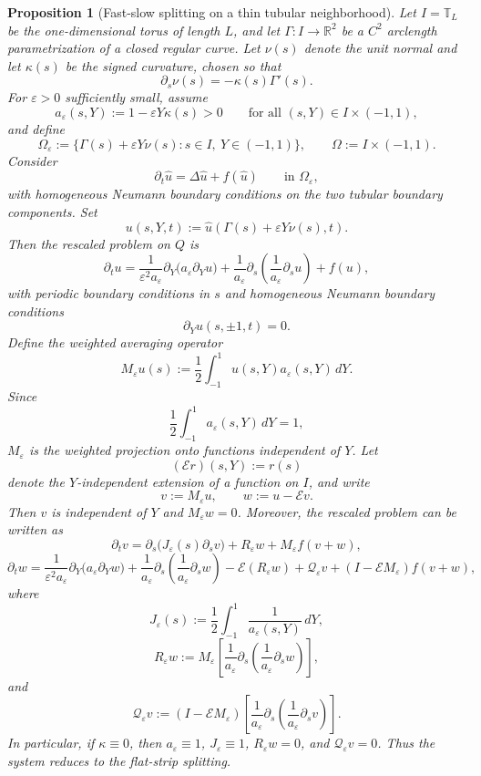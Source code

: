 \documentclass[11pt]{article}
\newtheorem{proposition}[theorem]{Proposition}
\theoremstyle{definition}
\theoremstyle{remark}
\numberwithin{equation}{section}
\begin{document}
\begin{proposition}[Fast-slow splitting on a thin tubular neighborhood]\label{prop:tubular}
Let \(I=\mathbb T_L\) be the one-dimensional torus of length \(L\), and let
\(\Gamma:I\to\mathbb R^2\) be a \(C^2\) arclength parametrization of a closed
regular curve. Let \(\nu(s)\) denote the unit normal and let \(\kappa(s)\) be
the signed curvature, chosen so that
\[
\partial_s\nu(s)=-\kappa(s)\Gamma'(s).
\]
For \(\varepsilon>0\) sufficiently small, assume
\[
a_\varepsilon(s,Y):=1-\varepsilon Y\kappa(s)>0
\qquad\text{for all }(s,Y)\in I\times(-1,1),
\]
and define
\[
\Omega_\varepsilon
:=
\{\Gamma(s)+\varepsilon Y\nu(s):s\in I,\ Y\in(-1,1)\},
\qquad
\Omega:=I\times(-1,1).
\]
Consider
\[
\partial_t\widehat u=\Delta \widehat u+f(\widehat u)
\qquad\text{in }\Omega_\varepsilon,
\]
with homogeneous Neumann boundary conditions on the two tubular boundary
components. Set
\[
u(s,Y,t):=\widehat u(\Gamma(s)+\varepsilon Y\nu(s),t).
\]
Then the rescaled problem on \(Q\) is
\[
\partial_t u
=
\frac{1}{\varepsilon^2a_\varepsilon}
\partial_Y\!\bigl(a_\varepsilon\partial_Yu\bigr)
+
\frac{1}{a_\varepsilon}
\partial_s\!\left(\frac{1}{a_\varepsilon}\partial_su\right)
+
f(u),
\]
with periodic boundary conditions in \(s\) and homogeneous Neumann boundary
conditions
\[
\partial_Yu(s,\pm1,t)=0.
\]
Define the weighted averaging operator
\[
M_\varepsilon u(s)
:=
\frac12\int_{-1}^1 u(s,Y)a_\varepsilon(s,Y)\,dY.
\]
Since
\[
\frac12\int_{-1}^1 a_\varepsilon(s,Y)\,dY=1,
\]
\(M_\varepsilon\) is the weighted projection onto functions independent of
\(Y\). Let
\[
(\mathcal E r)(s,Y):=r(s)
\]
denote the \(Y\)-independent extension of a function on \(I\), and write
\[
v:=M_\varepsilon u,\qquad
w:=u-\mathcal E v.
\]
Then \(v\) is independent of \(Y\) and \(M_\varepsilon w=0\). Moreover, the
rescaled problem can be written as
\[
\partial_t v
=
\partial_s\!\bigl(J_\varepsilon(s)\partial_s v\bigr)
+
R_\varepsilon w
+
M_\varepsilon f(v+w),
\]
\[
\partial_t w
=
\frac{1}{\varepsilon^2a_\varepsilon}
\partial_Y\!\bigl(a_\varepsilon\partial_Yw\bigr)
+
\frac{1}{a_\varepsilon}
\partial_s\!\left(\frac{1}{a_\varepsilon}\partial_sw\right)
-
\mathcal E(R_\varepsilon w)
+
\mathcal Q_\varepsilon v
+
(I-\mathcal E M_\varepsilon)f(v+w),
\]
where
\[
J_\varepsilon(s):=\frac12\int_{-1}^1
\frac{1}{a_\varepsilon(s,Y)}\,dY,
\]
\[
R_\varepsilon w
:=
M_\varepsilon\!\left[
\frac{1}{a_\varepsilon}
\partial_s\!\left(\frac{1}{a_\varepsilon}\partial_s w\right)
\right],
\]
and
\[
\mathcal Q_\varepsilon v
:=
(I-\mathcal E M_\varepsilon)\!\left[
\frac{1}{a_\varepsilon}
\partial_s\!\left(\frac{1}{a_\varepsilon}\partial_s v\right)
\right].
\]
In particular, if \(\kappa\equiv0\), then \(a_\varepsilon\equiv1\),
\(J_\varepsilon\equiv1\), \(R_\varepsilon w=0\), and
\(\mathcal Q_\varepsilon v=0\). Thus the system reduces to the flat-strip
splitting.
\end{proposition}
\end{document}

